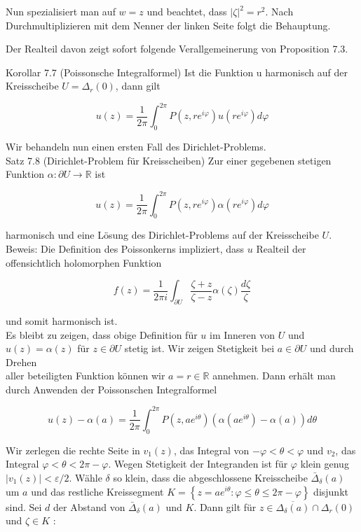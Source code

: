 \documentclass[10pt, letterpaper]{article}
\begin{document}
Nun spezialisiert man auf $w=z$ und beachtet, dass $|\zeta|^{2}=r^{2}$. Nach Durchmultiplizieren mit dem Nenner der linken Seite folgt die Behauptung.

Der Realteil davon zeigt sofort folgende Verallgemeinerung von Proposition 7.3.

Korollar 7.7 (Poissonsche Integralformel) Ist die Funktion u harmonisch auf der Kreisscheibe $U=\Delta_{r}(0)$, dann gilt

$$
u(z)=\frac{1}{2 \pi} \int_{0}^{2 \pi} P\left(z, r e^{i \varphi}\right) u\left(r e^{i \varphi}\right) d \varphi
$$

Wir behandeln nun einen ersten Fall des Dirichlet-Problems.\\
Satz 7.8 (Dirichlet-Problem für Kreisscheiben) Zur einer gegebenen stetigen Funktion $\alpha: \partial U \rightarrow \mathbb{R}$ ist

$$
u(z)=\frac{1}{2 \pi} \int_{0}^{2 \pi} P\left(z, r e^{i \varphi}\right) \alpha\left(r e^{i \varphi}\right) d \varphi
$$

harmonisch und eine Lösung des Dirichlet-Problems auf der Kreisscheibe $U$.\\
Beweis: Die Definition des Poissonkerns impliziert, dass $u$ Realteil der offensichtlich holomorphen Funktion

$$
f(z)=\frac{1}{2 \pi i} \int_{\partial U} \frac{\zeta+z}{\zeta-z} \alpha(\zeta) \frac{d \zeta}{\zeta}
$$

und somit harmonisch ist.\\
Es bleibt zu zeigen, dass obige Definition für $u$ im Inneren von $U$ und $u(z)= \alpha(z)$ für $z \in \partial U$ stetig ist. Wir zeigen Stetigkeit bei $a \in \partial U$ und durch Drehen\\
aller beteiligten Funktion können wir $a=r \in \mathbb{R}$ annehmen. Dann erhält man durch Anwenden der Poissonschen Integralformel

$$
u(z)-\alpha(a)=\frac{1}{2 \pi} \int_{0}^{2 \pi} P\left(z, a e^{i \theta}\right)\left(\alpha\left(a e^{i \theta}\right)-\alpha(a)\right) d \theta
$$

Wir zerlegen die rechte Seite in $v_{1}(z)$, das Integral von $-\varphi<\theta<\varphi$ und $v_{2}$, das Integral $\varphi<\theta<2 \pi-\varphi$. Wegen Stetigkeit der Integranden ist für $\varphi$ klein genug $\left|v_{1}(z)\right|<\varepsilon / 2$. Wähle $\delta$ so klein, dass die abgeschlossene Kreisscheibe $\bar{\Delta}_{\delta}(a)$ um $a$ und das restliche Kreissegment $K=\left\{z=a e^{i \theta}: \varphi \leq \theta \leq 2 \pi-\varphi\right\}$ disjunkt sind. Sei $d$ der Abstand von $\bar{\Delta}_{\delta}(a)$ und $K$. Dann gilt für $z \in \overline{\Delta_{\delta}(a)} \cap \Delta_{r}(0)$ und $\zeta \in K$ :
\end{document}
